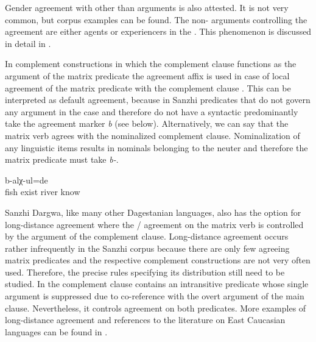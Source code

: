 Gender agreement with other than  arguments is also attested. It is not very common, but corpus examples can be found. The non- arguments controlling the agreement are either  agents or experiencers in the . This phenomenon is discussed in detail in . 

In complement constructions in which the complement clause functions as the  argument of the matrix predicate the agreement affix  is used in case of local agreement of the matrix predicate with the complement clause . This can be interpreted as default agreement, because in Sanzhi predicates that do not govern any argument in the  case and therefore do not have a syntactic  predominantly take the agreement marker \textit{b} (see below). Alternatively, we can say that the matrix verb agrees with the nominalized complement clause. Nominalization of any linguistic items results in nominals belonging to the neuter  and therefore the matrix predicate must take \textit{b-}. 
%
\begin{exe}
		\ex	\label{ex:(S/he/they) knew that there were our fish in our river@14a}
			b-alχ-ul=de\\
				fish	exist		river	know\\
		\glt	{}
\end{exe}

Sanzhi Dargwa, like many other Dagestanian languages, also has the option for long-distance agreement where the / agreement on the matrix verb is controlled by the  argument of the complement clause. Long-distance agreement occurs rather infrequently in the Sanzhi corpus because there are only few agreeing matrix predicates and the respective complement constructions are not very often used. Therefore, the precise rules specifying its distribution still need to be studied. In  the complement clause contains an intransitive predicate whose single argument is suppressed due to co-reference with the overt argument of the main clause. Nevertheless, it controls agreement on both predicates. More examples of long-distance agreement and references to the literature on East Caucasian languages can be found in .


